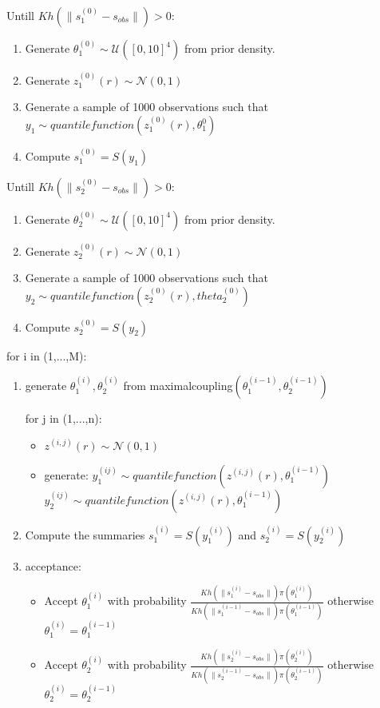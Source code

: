 \documentclass{article}
\begin{document}
Untill $Kh(\|s_{1}^{(0)} - s_{obs}\|)>0$:
\begin{enumerate}
	\item Generate $\theta_{1}^{(0)} \sim \mathcal{U}([0,10]^4)$ from prior density.
	\item Generate $z_{1}^{(0)}(r) \sim \mathcal{N}(0,1)$
	\item Generate a sample of 1000 observations such that $y_{1} \sim quantile function(z_{1}^{(0)}(r),\theta_{1}^{0})$
	\item Compute $s_{1}^{(0)}=S(y_{1})$
	
\end{enumerate}
Untill $Kh(\|s_{2}^{(0)} - s_{obs}\|)>0$:
\begin{enumerate}
	\item Generate $\theta_{2}^{(0)} \sim \mathcal{U}([0,10]^4)$ from prior density.
	\item Generate $z_{2}^{(0)}(r) \sim \mathcal{N}(0,1)$
	\item Generate a sample of 1000 observations such that $y_{2} \sim quantile function(z_{2}^{(0)}(r),theta_{2}^{(0)})$
	\item Compute $s_{2}^{(0)}=S(y_{2})$
\end{enumerate}


for i in (1,...,M):
\begin{enumerate}
	\item 	generate $\theta_{1}^{(i)},\theta_{2}^{(i)}$  from maximalcoupling$(\theta_{1}^{(i-1)},\theta_{2}^{(i-1)})$
	
	
		
		for j in (1,...,n):
		\begin{itemize}
			\item $z^{(i,j)}(r) \sim \mathcal{N}(0,1)$
			\item generate:
			$ y_{1}^{(ij)} \sim quantile function(z^{(i,j)}(r), \theta_{1}^{(i-1)})$
			$ y_{2}^{(ij)} \sim quantile function(z^{(i,j)}(r), \theta_{1}^{(i-1)})$
			
		\end{itemize}
	
	\item Compute the summaries  $ s_{1}^{(i)} =S(y_{1}^{(i)})$ and $ s_{2}^{(i)} =S(y_{2}^{(i)})$
	
	
	\item acceptance:
	\begin{itemize}
		\item Accept $\theta_{1}^{(i)}$ with probability $\frac{Kh(\|s_{1}^{(i)}-s_{obs}\|)\pi(\theta_{1}^{(i)})}{Kh(\|s_{1}^{(i-1)}- s_{obs}\|)\pi(\theta_{1}^{(i-1)})} $   otherwise $\theta_{1}^{(i)}=\theta_{1}^{(i-1)}$
		
		\item Accept $\theta_{2}^{(i)}$ with probability $\frac{Kh(\|s_{2}^{(i)}-s_{obs}\|)\pi(\theta_{2}^{(i)})}{Kh(\|s_{2}^{(i-1)}-s_{obs}\|)\pi(\theta_{2}^{(i-1)})} $  otherwise $  \theta_{2}^{(i)}=\theta_{2}^{(i-1)}$
	\end{itemize}
\end{enumerate}
\end{document}
